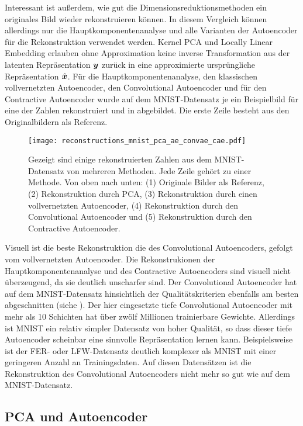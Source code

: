 Interessant ist außerdem, wie gut die Dimensionsreduktionsmethoden ein originales Bild wieder
rekonstruieren können. In diesem Vergleich können allerdings nur die Hauptkomponentenanalyse und
alle Varianten der Autoencoder für die Rekonstruktion verwendet werden. Kernel PCA und Locally
Linear Embedding erlauben ohne Approximation keine inverse Transformation aus der latenten
Repräsentation $\bm{y}$ zurück in eine approximierte ursprüngliche Repräsentation
$\hat{\bm{x}}$. Für die Hauptkomponentenanalyse, den klassischen vollvernetzten
Autoencoder, den Convolutional Autoencoder und für den Contractive Autoencoder wurde auf dem
MNIST-Datensatz je ein Beispielbild für eine der Zahlen rekonstruiert und in
 abgebildet. Die erste Zeile besteht aus den Originalbildern als
Referenz.
\begin{figure}[ht]
	\centering
	\texttt{[image: reconstructions\_mnist\_pca\_ae\_convae\_cae.pdf]}
	\caption[Rekonstruktierte MNIST-Zahlen]{Gezeigt sind einige rekonstruierten Zahlen aus dem MNIST-Datensatz von mehreren Methoden. Jede Zeile gehört zu einer Methode. Von oben nach unten: (1) Originale Bilder als Referenz, (2) Rekonstruktion durch PCA, (3) Rekonstruktion durch einen vollvernetzten Autoencoder, (4) Rekonstruktion durch den Convolutional Autoencoder und (5) Rekonstruktion durch den Contractive Autoencoder.}
	\label{fig:MNIST-reconstructions}
\end{figure}
Visuell ist die beste Rekonstruktion die des Convolutional Autoencoders, gefolgt vom vollvernetzten Autoencoder. Die Rekonstrukionen der Hauptkomponentenanalyse und des Contractive Autoencoders sind visuell nicht überzeugend, da sie deutlich unscharfer sind. Der Convolutional Autoencoder hat auf dem MNIST-Datensatz hinsichtlich der Qualitätskriterien ebenfalls am besten abgeschnitten (siehe ). Der hier eingesetzte tiefe Convolutional Autoencoder mit mehr als 10 Schichten hat über zwölf Millionen trainierbare Gewichte. Allerdings ist MNIST ein relativ simpler Datensatz von hoher Qualität, so dass dieser tiefe Autoencoder scheinbar eine sinnvolle Repräsentation lernen kann. Beispielsweise ist der FER- oder LFW-Datensatz deutlich komplexer als MNIST mit einer geringeren Anzahl an Trainingsdaten. Auf diesen Datensätzen ist die Rekonstruktion des Convolutional Autoencoders nicht mehr so gut wie auf dem MNIST-Datensatz.

\subsection{PCA und Autoencoder}
\label{ch:Vergleich:sec:Resultate:PCA_AE}

